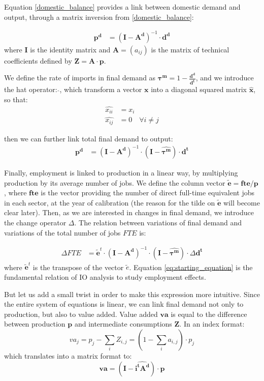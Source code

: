 Equation \ref{domestic_balance} provides a link between domestic demand and output, through a matrix inversion from \ref{domestic_balance}:

\begin{align*}
	\pmb{p^d} &= (\pmb{I} - \pmb{A^d})^{-1} \cdot \pmb{d^d}	
\end{align*}
where $\pmb{I}$ is the identity matrix and $\pmb{A}= (a_{ij})$ is the matrix of technical coefficients defined by $\pmb{Z} = \pmb{A} \cdot \pmb{p}$.

We define the rate of imports in final demand as $\pmb{\tau^m} = 1- \frac{\pmb{d^d}}{\pmb{d^t}}$, and we introduce the hat operator: $\widehat{  }$, which transform a vector $\pmb{x}$ into a diagonal squared matrix $\pmb{\hat{x}}$, so that:
\begin{align*}
	\widehat{x_{ii}} &=x_i \\
	\widehat{x_{ij}} &=0 \quad \forall i \ne j
\end{align*}

then we can further link total final demand to output:
\begin{align*}	
	\pmb{p^d} &= (\pmb{I} - \pmb{A^d})^{-1} \cdot (\pmb{I} - \pmb{\widehat{\tau^m}}) \cdot \pmb{d^t}	
\end{align*}

Finally, employment is linked to production in a linear way, by multiplying production by its average number of jobs. We define the column vector $\pmb{\tilde{e}} = \pmb{fte}/\pmb{p}$, where $\pmb{fte}$ is the vector providing the number of direct full-time equivalent jobs in each sector, at the year of calibration (the reason for the tilde on $\pmb{\tilde{e}}$ will become clear later). 
Then, as we are interested in changes in final demand, we introduce the change operator $\Delta$. 
The relation between variations of final demand and variations of the total number of jobs $FTE$ is:

\begin{align}	
	\Delta FTE &=  \pmb{\tilde{e}}^t \cdot (\pmb{I} - \pmb{A^d})^{-1} \cdot (\pmb{I} - \pmb{\widehat{\tau^m}})\cdot \Delta \pmb{d^t}
	\label{eq:starting_equation}
\end{align}
where $\pmb{\tilde{e}}^t$ is the transpose of the vector $\tilde{e}$. Equation \ref{eq:starting_equation} is the fundamental relation of IO analysis to study employment effects. 

But let us add a small twist in order to make this expression more intuitive. 
Since the entire system of equations is linear, we can link final demand not only to production, but also to value added.
Value added $\pmb{va}$ is equal to the difference between production $\pmb{p}$ and intermediate consumptions $\pmb{Z}$. 
In an index format:
$$va_j = p_j - \sum_i Z_{i,j} =  (1 - \sum_i a_{i,j}) \cdot p_j$$
which translates into a matrix format to:
$$\pmb{va} = (\pmb{I} - \widehat{\pmb{i^t A^d}}) \cdot \pmb{p}$$

